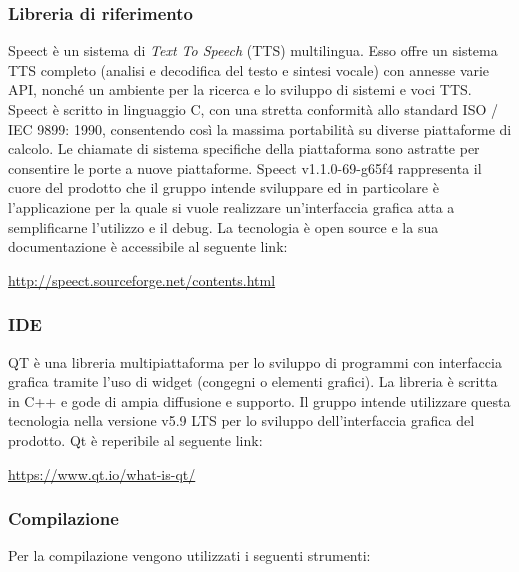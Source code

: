 \documentclass[../NormediProgetto.tex]{subfiles}
\begin{document}
	\subsubsection{Libreria di riferimento}
	Speect è un sistema di \textit{Text To Speech} (TTS) multilingua. Esso offre un sistema TTS completo (analisi e decodifica del testo e sintesi vocale) con annesse varie API, nonché un ambiente per la ricerca e lo sviluppo di sistemi e voci TTS. Speect è scritto in linguaggio C, con una stretta conformità allo standard ISO / IEC 9899: 1990, consentendo così la massima portabilità su diverse piattaforme di calcolo. Le chiamate di sistema specifiche della piattaforma sono astratte per consentire le porte a nuove piattaforme. Speect v1.1.0-69-g65f4 rappresenta il cuore del prodotto che il gruppo intende sviluppare ed in particolare è l'applicazione per la quale si vuole realizzare un'interfaccia grafica atta a semplificarne l'utilizzo e il debug. La tecnologia è open source e la sua documentazione è accessibile al seguente link:
	\begin{center}
		\url{http://speect.sourceforge.net/contents.html}
	\end{center}

	\subsubsection{IDE}
	QT è una libreria multipiattaforma per lo sviluppo di programmi con interfaccia grafica tramite l'uso di widget (congegni o elementi grafici). La libreria è scritta in C++ e gode di ampia diffusione e supporto. Il gruppo intende utilizzare questa tecnologia nella versione v5.9 LTS per lo sviluppo dell'interfaccia grafica del prodotto. Qt è reperibile al seguente link:
	\begin{center}
		\centerline{\url{https://www.qt.io/what-is-qt/}}
	\end{center}

	\subsubsection{Compilazione}

	Per la compilazione vengono utilizzati i seguenti strumenti:
\end{document}
